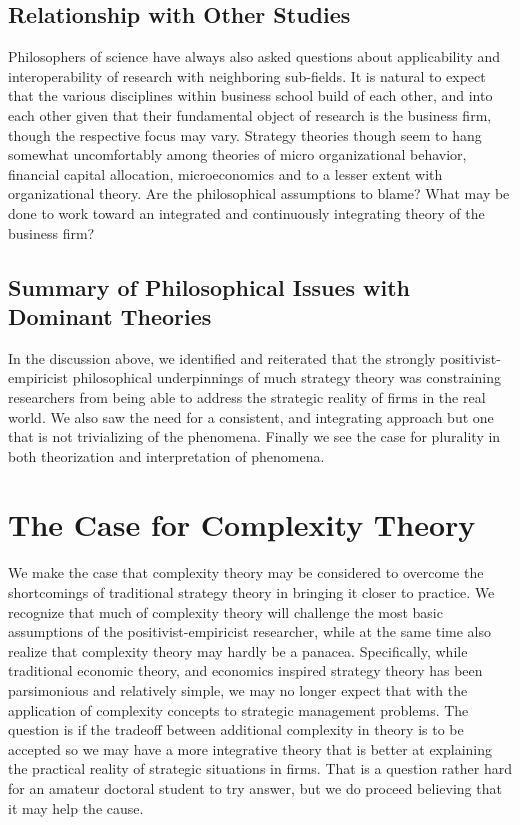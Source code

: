 \documentclass[12pt]{article}
\begin{document}
\subsection{Relationship with Other Studies}
Philosophers of science have always also asked questions about applicability and interoperability of research with neighboring sub-fields. It is natural to expect that the various disciplines within business school build of each other, and into each other given that their fundamental object of research is the business firm, though the respective focus may vary. Strategy theories though seem to hang somewhat uncomfortably among theories of micro organizational behavior, financial capital allocation, microeconomics and to a lesser extent with organizational theory. Are the philosophical assumptions to blame? What may be done to work toward an integrated and continuously integrating theory of the business firm?

\subsection{Summary of Philosophical Issues with Dominant Theories}
In the discussion above, we identified and reiterated that the strongly positivist-empiricist philosophical underpinnings of much strategy theory was constraining researchers from being able to address the strategic reality of firms in the real world. We also saw the need for a consistent, and integrating approach but one that is not trivializing of the phenomena. Finally we see the case for plurality in both theorization and interpretation of phenomena.

\section{The Case for Complexity Theory}\label{S:ComplexityTheory}
We make the case that complexity theory may be considered to overcome the shortcomings of traditional strategy theory in bringing it closer to practice. We recognize that much of complexity theory will challenge the most basic assumptions of the positivist-empiricist researcher, while at the same time also realize that complexity theory may hardly be a panacea. Specifically, while traditional economic theory, and economics inspired strategy theory has been parsimonious and relatively simple, we may no longer expect that with the application of complexity concepts to strategic management problems. The question is if the tradeoff between additional complexity in theory is to be accepted so we may have a more integrative theory that is better at explaining the practical reality of strategic situations in firms. That is a question rather hard for an amateur doctoral student to try answer, but we do proceed believing that it may help the cause.
\end{document}
